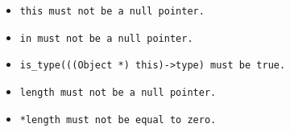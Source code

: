 \begin{itemize}[nosep]

\item \tt{this} must not be a null pointer.

\item \tt{in}   must not be a null pointer.

\item \tt{is_type(((Object *) this)->type)} must be \tt{true}.

\item \phantom{*}\tt{length} must not be a null pointer.

\item \tt{*length} must not be equal to zero.

\end{itemize}
